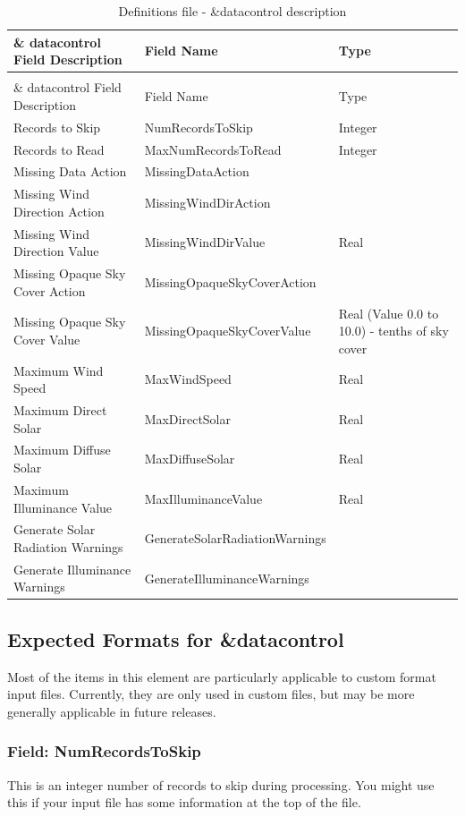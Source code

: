 \begin{longtable}[c]{p{1.81in}p{1.65in}p{2.52in}}
\caption{Definitions file - \&datacontrol description \label{table:definitions-file-datacontrol-description}} \tabularnewline
\toprule 
\& datacontrol Field Description & Field Name & Type \tabularnewline
\midrule
\endfirsthead

\caption[]{Definitions file - \&datacontrol description} \tabularnewline
\toprule 
\& datacontrol Field Description & Field Name & Type \tabularnewline
\midrule
\endhead

Records to Skip & NumRecordsToSkip & Integer \tabularnewline
Records to Read & MaxNumRecordsToRead & Integer \tabularnewline
Missing Data Action & MissingDataAction &  \tabularnewline
Missing Wind Direction Action & MissingWindDirAction &  \tabularnewline
Missing Wind Direction Value & MissingWindDirValue & Real \tabularnewline
Missing Opaque Sky Cover Action & MissingOpaqueSkyCoverAction &  \tabularnewline
Missing Opaque Sky Cover Value & MissingOpaqueSkyCoverValue & Real (Value 0.0 to 10.0) - tenths of sky cover \tabularnewline
Maximum Wind Speed & MaxWindSpeed & Real \tabularnewline
Maximum Direct Solar & MaxDirectSolar & Real \tabularnewline
Maximum Diffuse Solar & MaxDiffuseSolar & Real \tabularnewline
Maximum Illuminance Value & MaxIlluminanceValue & Real \tabularnewline
Generate Solar Radiation Warnings & GenerateSolarRadiationWarnings &  \tabularnewline
Generate Illuminance Warnings & GenerateIlluminanceWarnings &  \tabularnewline
\bottomrule
\end{longtable}

\subsection{Expected Formats for \&datacontrol}\label{expected-formats-for-datacontrol}

Most of the items in this element are particularly applicable to custom format input files. Currently, they are only used in custom files, but may be more generally applicable in future releases.

\subsubsection{Field: NumRecordsToSkip}\label{field-numrecordstoskip}

This is an integer number of records to skip during processing. You might use this if your input file has some information at the top of the file.

